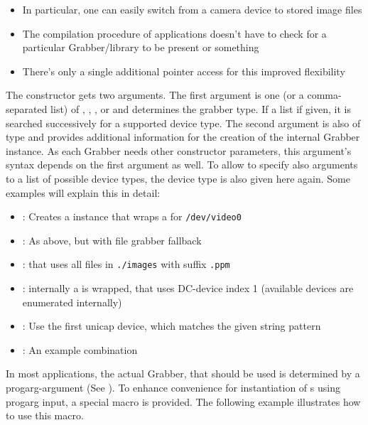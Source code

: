\begin{enumerate}
\begin{itemize}
\item In particular, one can easily switch from a camera device to stored image files
\item The compilation procedure of applications doesn't have to check for a particular Grabber/library to be present or something
\item There's only a single additional pointer access for this improved flexibility
\end{itemize}
The  constructor gets two arguments. The first argument is one (or a comma-separated list) of , , ,  or   and determines the grabber type. If a list if given, it is searched successively for a supported device type. The second argument is also of type  and provides additional information for the creation of the internal Grabber instance. As each Grabber needs other constructor parameters, this argument's syntax depends on the first argument as well. To allow to specify also arguments to a list of possible device types, the device type is also given here again. Some examples will explain this in detail:
\begin{itemize}
\item {}: Creates a  instance that wraps a  for \texttt{/dev/video0}
\item {}: As above, but with file grabber fallback
\item {}:  that uses all files in \texttt{./images} with suffix \texttt{.ppm}
\item {}: internally a  is wrapped, that uses DC-device index 1 (available devices are enumerated internally)
\item {}: Use the first unicap device, which matches the given string pattern
\item {}: An example combination
\end{itemize}
In most applications, the actual Grabber, that should be used is determined by a progarg-argument (See ). To enhance convenience for instantiation of  s using progarg input, a special macro  is provided. The following example illustrates how to use this macro. 


\end{enumerate}
